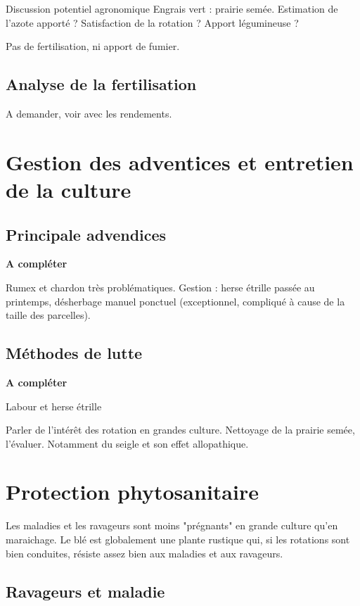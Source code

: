\documentclass{article}
\begin{document}
Discussion potentiel agronomique Engrais vert : prairie semée. Estimation de l'azote apporté ? Satisfaction de la rotation ? Apport légumineuse ?

Pas de fertilisation, ni apport de fumier.

\subsection{Analyse de la fertilisation}

A demander, voir avec les rendements. 

\section{Gestion des adventices et entretien de la culture}

\subsection{Principale advendices}

\textbf{A compléter}

Rumex et chardon très problématiques. Gestion : herse étrille passée au printemps, désherbage manuel ponctuel (exceptionnel, compliqué à cause de la taille des parcelles).

\subsection{Méthodes de lutte}

\textbf{A compléter}

Labour et herse étrille

Parler de l'intérêt des rotation en grandes culture. Nettoyage de la prairie semée, l'évaluer. Notamment du seigle et son effet allopathique.

\section{Protection phytosanitaire}

Les maladies et les ravageurs sont moins "prégnants" en grande culture qu'en maraichage. Le blé est globalement une plante rustique qui, si les rotations sont bien conduites, résiste assez bien aux maladies et aux ravageurs.

\subsection{Ravageurs et maladie}
\end{document}
